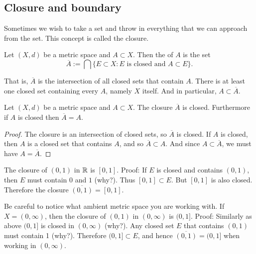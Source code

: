 \subsection{Closure and boundary}

Sometimes we wish to take a set and throw in everything that we can approach
from the set.  This concept is called the closure.

\begin{defn}
Let $(X,d)$ be a metric space and $A \subset X$.  Then
the \emph{} of $A$ is the set
\begin{equation*}
\overline{A} := \bigcap \{ E \subset X : \text{$E$ is closed and $A \subset
E$} \} .
\end{equation*}
\end{defn}

That is,
$\overline{A}$ is the intersection of all closed sets that contain $A$.
There is at least one closed set containing every $A$, namely $X$ itself.
And in particular, $A \subset \overline{A}$.

\begin{prop}
Let $(X,d)$ be a metric space and $A \subset X$.  The closure $\overline{A}$
is closed.  Furthermore if $A$ is closed then $\overline{A} = A$.
\end{prop}

\begin{proof}
The closure is an intersection of closed sets, so $\overline{A}$ is closed.
If $A$ is closed, then $A$ is a closed set that contains $A$,
and so $\overline{A} \subset A$.  And since $A \subset \overline{A}$,
we must have $A = \overline{A}$.
\end{proof}

\begin{example}
The closure of $(0,1)$ in ${\mathbb{R}}$ is $[0,1]$.  Proof:  If
$E$ is closed and contains $(0,1)$, then $E$ must contain $0$ and $1$ (why?).
Thus $[0,1] \subset E$.  But $[0,1]$ is also closed.
Therefore the closure $\overline{(0,1)} = [0,1]$.
\end{example}

\begin{example}
Be careful to notice what ambient metric space you are working with.
If $X = (0,\infty)$, then
the closure of $(0,1)$ in $(0,\infty)$ is $(0,1]$.  Proof:  Similarly as
above $(0,1]$ is closed in $(0,\infty)$ (why?).  Any closed set $E$
that contains $(0,1)$ must contain 1 (why?).  Therefore $(0,1] \subset E$,
and hence $\overline{(0,1)} = (0,1]$ when working in $(0,\infty)$.
\end{example}

